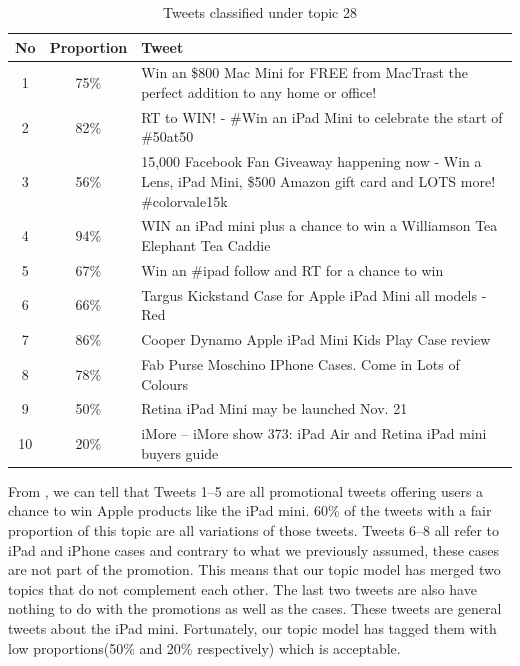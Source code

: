 \begin{table}[H]
  \begin{tabular}{c c p{13cm}} \toprule
    No & Proportion & Tweet \\ \midrule
    1  & 75\%       & Win an \$800 Mac Mini for FREE from MacTrast the perfect addition to any home or office! \\ \midrule
    2  & 82\%       & RT to WIN! - \#Win an iPad Mini to celebrate the start of \#50at50 \\ \midrule
    3  & 56\%       & 15,000 Facebook Fan Giveaway happening now - Win a Lens, iPad Mini, \$500 Amazon gift card and LOTS more! \#colorvale15k \\ \midrule
    4  & 94\%       & WIN an iPad mini plus a chance to win a Williamson Tea Elephant Tea Caddie \\ \midrule
    5  & 67\%       & Win an \#ipad follow and RT for a chance to win \\ \midrule
    6  & 66\%       & Targus Kickstand Case for Apple iPad Mini all models - Red \\ \midrule
    7  & 86\%       & Cooper Dynamo Apple iPad Mini Kids Play Case review \\ \midrule
    8  & 78\%       & Fab Purse Moschino IPhone Cases. Come in Lots of Colours \\ \midrule
    9  & 50\%       & Retina iPad Mini may be launched Nov. 21 \\ \midrule
    10 & 20\%       & iMore -- iMore show 373: iPad Air and Retina iPad mini buyers guide \\ \midrule
  \end{tabular}
  \caption{Tweets classified under topic 28}
  \label{tab:topic-28-tweets}
\end{table}

From , we can tell that Tweets 1--5 are all promotional tweets
offering users a chance to win Apple products like the iPad mini. 60\% of the tweets with a fair
proportion of this topic are all variations of those tweets. Tweets 6--8 all refer to iPad and
iPhone cases and contrary to what we previously assumed, these cases are not part of the promotion.
This means that our topic model has merged two topics that do not complement each other. The last
two tweets are also have nothing to do with the promotions as well as the cases. These tweets are
general tweets about the iPad mini. Fortunately, our topic model has tagged them with low
proportions(50\% and 20\% respectively) which is acceptable.



